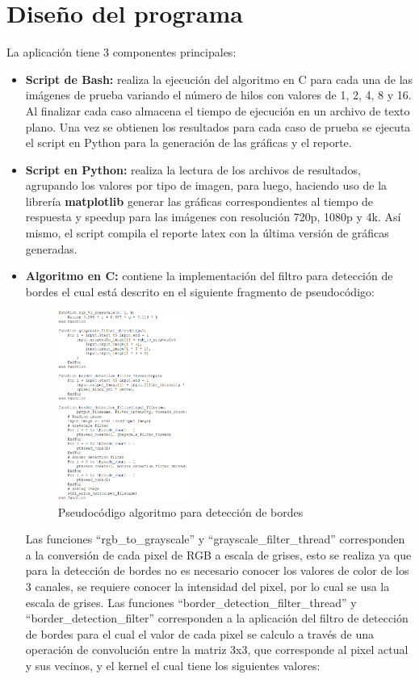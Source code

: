 \section{Diseño del programa}
La aplicación tiene 3 componentes principales:
\begin{itemize}
    \item \textbf{Script de Bash:} realiza la ejecución del algoritmo en C para cada una de las imágenes de prueba variando el número de hilos con valores de 1, 2, 4, 8 y 16. Al finalizar cada caso almacena el tiempo de ejecución en un archivo de texto plano. Una vez se obtienen los resultados para cada caso de prueba se ejecuta el script en Python para la generación de las gráficas y el reporte.
    \item \textbf{Script en Python:} realiza la lectura de los archivos de resultados, agrupando los valores por tipo de imagen, para luego, haciendo uso de la librería \textbf{matplotlib} generar las gráficas correspondientes al tiempo de respuesta y speedup para las imágenes con resolución 720p, 1080p y 4k. Así mismo, el script compila el reporte latex con la última versión de gráficas generadas.
    \item \textbf{Algoritmo en C:} contiene la implementación del filtro para detección de bordes el cual está descrito en el siguiente fragmento de pseudocódigo:
    \begin{figure}[H]
        \centering
        \includegraphics[width=0.4\textwidth]{../plots/pseudocode.PNG}
        \caption{Pseudocódigo algoritmo para detección de bordes}
    \end{figure}
    Las funciones ``rgb\_to\_grayscale'' y ``grayscale\_filter\_thread'' corresponden a la conversión de cada pixel de RGB a escala de grises, esto se realiza ya que para la detección de bordes no es necesario conocer los valores de color de los 3 canales, se requiere conocer la intensidad del pixel, por lo cual se usa la escala de grises. Las funciones ``border\_detection\_filter\_thread'' y ``border\_detection\_filter'' corresponden a la aplicación del filtro de detección de bordes para el cual el valor de cada pixel se calculo a través de una operación de convolución entre la matriz 3x3, que corresponde al pixel actual y sus vecinos, y el kernel el cual tiene los siguientes valores:

\end{itemize}
